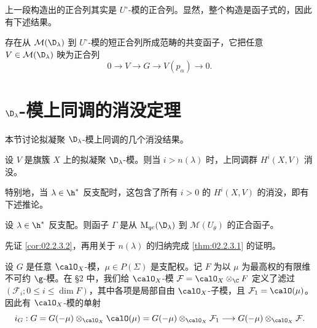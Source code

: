 上一段构造出的正合列其实是 $U^\circ$-模的正合列。显然，整个构造是函子式的，因此有下述结果。

\begin{lemma}\label{lem:02.2.2.3}
存在从 $\mathcal{M}(\D_\lambda)$ 到 $U^\circ$-模的短正合列所成范畴的共变函子，它把任意 $V\in \mathcal{M}(\D_\lambda)$ 映为正合列
\[
0\longrightarrow V\longrightarrow G\longrightarrow V(p_\alpha)\longrightarrow 0.
\]
\end{lemma}

\section{$\D_\lambda$-模上同调的消没定理}
\label{sec:02.2.3}

本节讨论拟凝聚 $\D_\lambda$-模上同调的几个消没结果。

\begin{theorem}\label{thm:02.2.3.1}
设 $V$ 是旗簇 $X$ 上的拟凝聚 $\D_\lambda$-模。则当 $i>n(\lambda)$ 时，上同调群 $H^i(X,V)$ 消没。
\end{theorem}

特别地，当 $\lambda\in\h^*$ 反支配时，这包含了所有 $i>0$ 的 $H^i(X,V)$ 的消没，即有下述推论。

\begin{corollary}\label{cor:02.2.3.2}
设 $\lambda\in\h^*$ 反支配。则函子 $\Gamma$ 是从 $\mathrm{M}_{qc}(\D_\lambda)$ 到 $\mathcal{M}(U_\theta)$ 的正合函子。
\end{corollary}

先证 \ref{cor:02.2.3.2}，再用关于 $n(\lambda)$ 的归纳完成 \ref{thm:02.2.3.1} 的证明。

设 $G$ 是任意 $\calO_X$-模，$\mu\in P(\Sigma)$ 是支配权。记 $F$ 为以 $\mu$ 为最高权的有限维不可约 $\g$-模。在 §2 中，我们给 $\calO_X$-模 $\mathcal{F}=\calO_X\otimes_\C F$ 定义了滤过 $(\mathcal{F}_i;0\le i\le\dim F)$，其中各项是局部自由 $\calO_X$-子模，且 $\mathcal{F}_1=\calO(\mu)$。因此有 $\calO_X$-模的单射
\[
i_G:G=G(-\mu)\otimes_{\calO_X}\calO(\mu)=G(-\mu)\otimes_{\calO_X}\mathcal{F}_1
\longrightarrow G(-\mu)\otimes_{\calO_X}\mathcal{F} .
\]

